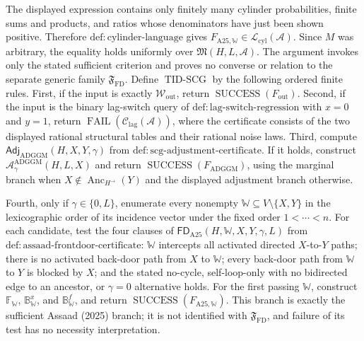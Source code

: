 The displayed expression contains only finitely many cylinder probabilities, finite sums and products, and ratios whose denominators have just been shown positive.  Therefore \(\mathrm{def:cylinder\text{-}language}\) gives \(F_{\mathrm{A25},\mathbb W}\in\mathcal L_{\mathrm{cyl}}(\mathcal A)\).  Since \(M\) was arbitrary, the equality holds uniformly over \(\mathfrak M(H,L,\mathcal A)\).  The argument invokes only the stated sufficient criterion and proves no converse or relation to the separate generic family \(\mathfrak F_{\mathrm{FD}}\).
Define \(\operatorname{TID\text{-}SCG}\) by the following ordered finite rules.  First, if the input is exactly \(\mathcal W_{\mathrm{out}}\), return \(\operatorname{SUCCESS}(F_{\mathrm{out}})\).  Second, if the input is the binary lag-switch query of \(\mathrm{def:lag\text{-}switch\text{-}regression}\) with \(x=0\) and \(y=1\), return \(\operatorname{FAIL}(\mathcal C_{\mathrm{lag}}(\mathcal A))\), where the certificate consists of the two displayed rational structural tables and their rational noise laws.  Third, compute \(\mathsf{Adj}_{\mathrm{ADGGM}}(H,X,Y,\gamma)\) from \(\mathrm{def:scg\text{-}adjustment\text{-}certificate}\).  If it holds, construct \(\mathcal A_{\gamma}^{\mathrm{ADGGM}}(H,L,X)\) and return \(\operatorname{SUCCESS}(F_{\mathrm{ADGGM}})\), using the marginal branch when \(X\notin\operatorname{Anc}_{H^{\to}}(Y)\) and the displayed adjustment branch otherwise.

Fourth, only if \(\gamma\in\{0,L\}\), enumerate every nonempty \(\mathbb W\subseteq V\setminus\{X,Y\}\) in the lexicographic order of its incidence vector under the fixed order \(1<\cdots<n\).  For each candidate, test the four clauses of \(\mathsf{FD}_{\mathrm{A25}}(H,\mathbb W,X,Y,\gamma,L)\) from \(\mathrm{def:assaad\text{-}frontdoor\text{-}certificate}\): \(\mathbb W\) intercepts all activated directed \(X\)-to-\(Y\) paths; there is no activated back-door path from \(X\) to \(\mathbb W\); every back-door path from \(\mathbb W\) to \(Y\) is blocked by \(X\); and the stated no-cycle, self-loop-only with no bidirected edge to an ancestor, or \(\gamma=0\) alternative holds.  For the first passing \(\mathbb W\), construct \(\mathbb F_{\mathbb W}\), \(\mathbb B^x_{\mathbb W}\), and \(\mathbb B^f_{\mathbb W}\), and return \(\operatorname{SUCCESS}(F_{\mathrm{A25},\mathbb W})\).  This branch is exactly the sufficient Assaad (2025) branch; it is not identified with \(\mathfrak F_{\mathrm{FD}}\), and failure of its test has no necessity interpretation.

